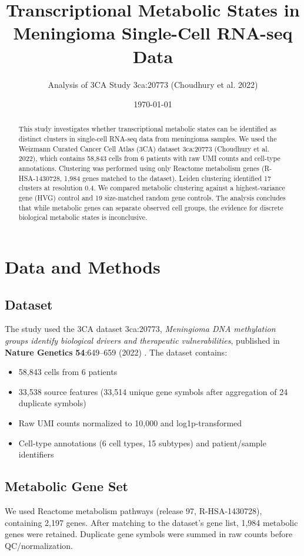 \documentclass[11pt,a4paper]{article}
\title{Transcriptional Metabolic States in Meningioma Single-Cell RNA-seq Data}
\author{Analysis of 3CA Study 3ca:20773 (Choudhury et al. 2022)}
\date{\today}
\begin{document}
\maketitle

\begin{abstract}
This study investigates whether transcriptional metabolic states can be identified as distinct clusters in single-cell RNA-seq data from meningioma samples. We used the Weizmann Curated Cancer Cell Atlas (3CA) dataset 3ca:20773 (Choudhury et al. 2022), which contains 58,843 cells from 6 patients with raw UMI counts and cell-type annotations. Clustering was performed using only Reactome metabolism genes (R-HSA-1430728, 1,984 genes matched to the dataset). Leiden clustering identified 17 clusters at resolution 0.4. We compared metabolic clustering against a highest-variance gene (HVG) control and 19 size-matched random gene controls. The analysis concludes that while metabolic genes can separate observed cell groups, the evidence for discrete biological metabolic states is inconclusive.
\end{abstract}

\section{Data and Methods}

\subsection{Dataset}
The study used the 3CA dataset 3ca:20773, \textit{Meningioma DNA methylation groups identify biological drivers and therapeutic vulnerabilities}, published in \textbf{Nature Genetics} \textbf{54}:649--659 (2022) \cite{choudhury2022}. The dataset contains:
\begin{itemize}
    \item 58,843 cells from 6 patients
    \item 33,538 source features (33,514 unique gene symbols after aggregation of 24 duplicate symbols)
    \item Raw UMI counts normalized to 10,000 and log1p-transformed
    \item Cell-type annotations (6 cell types, 15 subtypes) and patient/sample identifiers
\end{itemize}

\subsection{Metabolic Gene Set}
We used Reactome metabolism pathways (release 97, R-HSA-1430728), containing 2,197 genes. After matching to the dataset's gene list, 1,984 metabolic genes were retained. Duplicate gene symbols were summed in raw counts before QC/normalization.
\end{document}
